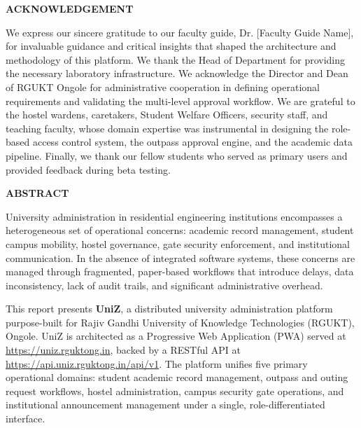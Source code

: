 \documentclass[12pt,a4paper]{report}
\begin{document}
\newpage\thispagestyle{empty}
\begin{center}{\LARGE \textbf{ACKNOWLEDGEMENT}}\end{center}\vspace{0.8cm}
\noindent We express our sincere gratitude to our faculty guide, Dr. [Faculty Guide Name], for invaluable guidance and critical insights that shaped the architecture and methodology of this platform. We thank the Head of Department for providing the necessary laboratory infrastructure. We acknowledge the Director and Dean of RGUKT Ongole for administrative cooperation in defining operational requirements and validating the multi-level approval workflow. We are grateful to the hostel wardens, caretakers, Student Welfare Officers, security staff, and teaching faculty, whose domain expertise was instrumental in designing the role-based access control system, the outpass approval engine, and the academic data pipeline. Finally, we thank our fellow students who served as primary users and provided feedback during beta testing.

\newpage\thispagestyle{empty}
\begin{center}{\LARGE \textbf{ABSTRACT}}\end{center}\vspace{0.8cm}

\noindent University administration in residential engineering institutions encompasses a heterogeneous set of operational concerns: academic record management, student campus mobility, hostel governance, gate security enforcement, and institutional communication. In the absence of integrated software systems, these concerns are managed through fragmented, paper-based workflows that introduce delays, data inconsistency, lack of audit trails, and significant administrative overhead.

\vspace{0.4cm}
\noindent This report presents \textbf{UniZ}, a distributed university administration platform purpose-built for Rajiv Gandhi University of Knowledge Technologies (RGUKT), Ongole. UniZ is architected as a Progressive Web Application (PWA) served at \url{https://uniz.rguktong.in}, backed by a RESTful API at \url{https://api.uniz.rguktong.in/api/v1}. The platform unifies five primary operational domains: student academic record management, outpass and outing request workflows, hostel administration, campus security gate operations, and institutional announcement management under a single, role-differentiated interface.
\end{document}
